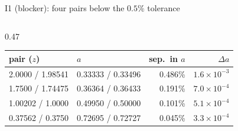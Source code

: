 \documentclass[UTF8]{beamer}
\begin{document}
\begin{frame}{I1 (blocker): four pairs below the $0.5\%$ tolerance}
  \footnotesize
  \begin{columns}[T,totalwidth=\textwidth]
    \begin{column}{0.47\textwidth}
      \scriptsize\setlength{\tabcolsep}{2pt}
      \begin{tabular}{@{}llrr@{}}
        \toprule
        pair ($z$) & $a$ & sep.\ in $a$ & $\Delta a$ \\
        \midrule
        2.0000 / 1.98541 & 0.33333 / 0.33496 & 0.486\% & $1.6\times10^{-3}$ \\
        1.7500 / 1.74475 & 0.36364 / 0.36433 & 0.191\% & $7.0\times10^{-4}$ \\
        1.00202 / 1.0000 & 0.49950 / 0.50000 & 0.101\% & $5.1\times10^{-4}$ \\
        0.37562 / 0.3750 & 0.72695 / 0.72727 & 0.045\% & $3.3\times10^{-4}$ \\
        \bottomrule
      \end{tabular}


\end{column}
\end{columns}
\end{frame}
\end{document}
